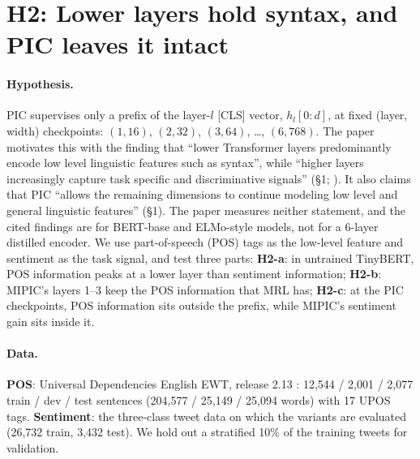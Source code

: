 \section{H2: Lower layers hold syntax, and PIC leaves it intact}
\label{sec:h2}

\paragraph{Hypothesis.}
PIC supervises only a prefix of the layer-$l$ [CLS] vector, $h_l[0{:}d]$, at fixed (layer, width) checkpoints: $(1,16)$, $(2,32)$, $(3,64)$, \dots, $(6,768)$.
The paper motivates this with the finding that ``lower Transformer layers predominantly encode low level linguistic features such as syntax'', while ``higher layers increasingly capture task specific and discriminative signals'' (\S1; \citealp{jawahar-etal-2019-bert,liu-etal-2019-linguistic}).
It also claims that PIC ``allows the remaining dimensions to continue modeling low level and general linguistic features'' (\S1).
The paper measures neither statement, and the cited findings are for BERT-base and ELMo-style models, not for a 6-layer distilled encoder.
We use part-of-speech (POS) tags as the low-level feature and sentiment as the task signal, and test three parts:
\textbf{H2-a}: in untrained TinyBERT, POS information peaks at a lower layer than sentiment information;
\textbf{H2-b}: MIPIC's layers 1--3 keep the POS information that MRL has;
\textbf{H2-c}: at the PIC checkpoints, POS information sits outside the prefix, while MIPIC's sentiment gain sits inside it.

\paragraph{Data.}
\textbf{POS}: Universal Dependencies English EWT, release 2.13 \citep{silveira-etal-2014-gold}: 12,544 / 2,001 / 2,077 train / dev / test sentences (204,577 / 25,149 / 25,094 words) with 17 UPOS tags.
\textbf{Sentiment}: the three-class tweet data on which the variants are evaluated (26,732 train, 3,432 test).
We hold out a stratified 10\% of the training tweets for validation.

